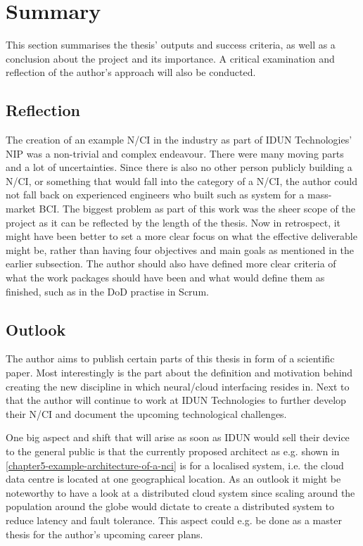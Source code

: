 \section{Summary}
\label{chapter5-summary}

This section summarises the thesis' outputs and success criteria, as well as a conclusion about the project and its importance. A critical examination and reflection of the author's approach will also be conducted.


\subsection{Reflection}
\label{chapter5-reflection}

The creation of an example N/CI in the industry as part of IDUN Technologies' NIP was a non-trivial and complex endeavour. There were many moving parts and a lot of uncertainties. Since there is also no other person publicly building a N/CI, or something that would fall into the category of a N/CI, the author could not fall back on experienced engineers who built such as system for a mass-market BCI. The biggest problem as part of this work was the sheer scope of the project as it can be reflected by the length of the thesis. Now in retrospect, it might have been better to set a more clear focus on what the effective deliverable might be, rather than having four objectives and main goals as mentioned in the earlier subsection. The author should also have defined more clear criteria of what the work packages should have been and what would define them as finished, such as in the DoD practise in Scrum.

\subsection{Outlook}
\label{chapter5-outlook}

The author aims to publish certain parts of this thesis in form of a scientific paper. Most interestingly is the part about the definition and motivation behind creating the new discipline in which neural/cloud interfacing resides in. Next to that the author will continue to work at IDUN Technologies to further develop their N/CI and document the upcoming technological challenges.

One big aspect and shift that will arise as soon as IDUN would sell their device to the general public is that the currently proposed architect as e.g. shown in \autoref{chapter5-example-architecture-of-a-nci} is for a localised system, i.e. the cloud data centre is located at one geographical location. As an outlook it might be noteworthy to have a look at a distributed cloud system since scaling around the population around the globe would dictate to create a distributed system to reduce latency and fault tolerance. This aspect could e.g. be done as a master thesis for the author's upcoming career plans.

